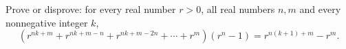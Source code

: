 Prove or disprove: for every real number $r>0$, all real numbers $n,m$ and every nonnegative integer $k$,
\[\left(r^{nk+m}+r^{nk+m-n}+r^{nk+m-2n}+\cdots+r^m\right)\left(r^n-1\right)=r^{n(k+1)+m}-r^m.\]
